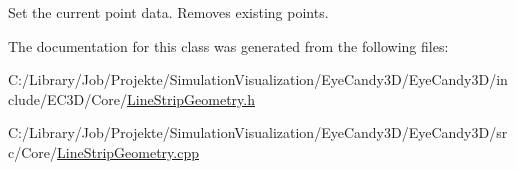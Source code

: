 Set the current point data. Removes existing points. 



The documentation for this class was generated from the following files\+:\begin{DoxyCompactItemize}
\item 
C\+:/\+Library/\+Job/\+Projekte/\+Simulation\+Visualization/\+Eye\+Candy3\+D/\+Eye\+Candy3\+D/include/\+E\+C3\+D/\+Core/\mbox{\hyperlink{_line_strip_geometry_8h}{Line\+Strip\+Geometry.\+h}}\item 
C\+:/\+Library/\+Job/\+Projekte/\+Simulation\+Visualization/\+Eye\+Candy3\+D/\+Eye\+Candy3\+D/src/\+Core/\mbox{\hyperlink{_line_strip_geometry_8cpp}{Line\+Strip\+Geometry.\+cpp}}\end{DoxyCompactItemize}
